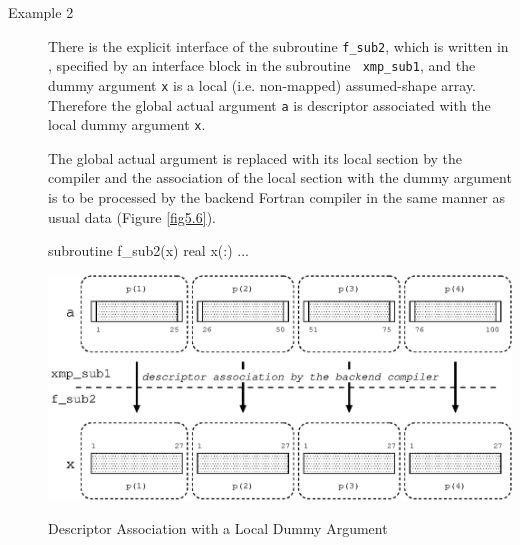 \begin{description}
\item[Example 2]

	   There is the explicit interface of the subroutine
	   {\tt f\_sub2}, which is written in {\Fort},
	   specified by an interface block in the subroutine {\tt
	   xmp\_sub1}, and the dummy argument {\tt x} is a local
	   (i.e. non-mapped) assumed-shape array. Therefore the global
	   actual argument {\tt a} is descriptor associated with the
	   local dummy argument {\tt x}.

	   The global actual argument is replaced with its local section
	   by the {\XMP} compiler and the association of the local
	   section with the dummy argument is to be processed by the
	   backend Fortran compiler in the same manner as usual data 
	   (Figure \ref{fig5.6}).

\begin{Fexample}
      subroutine f_sub2(x)
      real x(:)
      ...
\end{Fexample}

\begin{myfigure}
 \includegraphics[scale=0.7]{figs/fig5.6.eps}
 \caption{Descriptor Association with a Local Dummy Argument}
 \label{fig5.6}
\end{myfigure}

\end{description}


